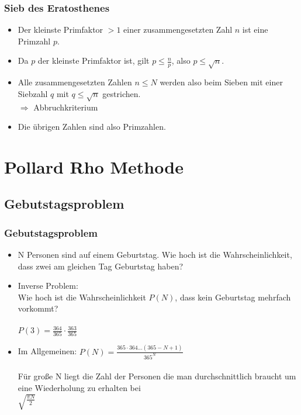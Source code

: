 \documentclass[mathserif, compress]{beamer}
\begin{document}
\begin{frame}
  \frametitle{Sieb des Eratosthenes}   %

  \begin{itemize}
  \item<2-> Der kleinste Primfaktor $> 1$ einer zusammengesetzten Zahl $n$ ist eine Primzahl $p$. 
  \vspace{3mm}
  \item<3-> Da $p$ der kleinste Primfaktor ist, gilt $p \leq \frac{n}{p}$, also $ p \leq \sqrt{n} $.
  \vspace{3mm}
  \item<4-> Alle zusammengesetzten Zahlen $n\leq N$ werden also beim Sieben mit einer Siebzahl $q$ mit $q \leq \sqrt{n}$ gestrichen.\\
            $\Rightarrow$ Abbruchkriterium
  \vspace{3mm}
  \item<5-> Die \"ubrigen Zahlen sind also Primzahlen.
  \end{itemize}
\end{frame}


\section{Pollard Rho Methode}

\subsection{Gebutstagsproblem}

\begin{frame}
  \frametitle{Gebutstagsproblem}
  \begin{itemize}
    \item<2-> N Personen sind auf einem Geburtstag. Wie hoch ist die Wahrscheinlichkeit, dass zwei am gleichen Tag Geburtstag haben?
    \vspace{3mm}
    \item<3-> Inverse Problem: \\ Wie hoch ist die Wahrscheinlichkeit $P(N)$, dass kein Geburtstag mehrfach vorkommt?\\
    \ \\ $P(3)=\frac{364}{365}\cdot \frac{363}{365}$
    \vspace{3mm}
    \item<4-> Im Allgemeinen: $P(N)=\frac{365\cdot 364...(365-N+1)}{365^N}$\\
    \ \\     F\"ur gro\ss{}e N liegt die Zahl der Personen die man durchschnittlich braucht um eine Wiederholung zu erhalten bei \\
	     $\sqrt{\frac{\pi N}{2}}$
  \end{itemize}
\end{frame}
\end{document}
